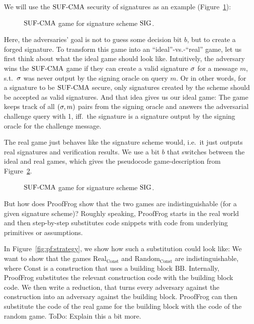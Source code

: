 We will use the ${\mathrm{SUF}\text{-}\mathrm{CMA}}$ security of signatures as an example (Figure~\ref{fig:pf:sufcma}):
\begin{figure}[ht]
    \centering
    \nicoresetlinenr%
    \fbox{%
        \scalebox{\codescalefactor}{%
            
        }%
    }
    \caption{${\mathrm{SUF}\text{-}\mathrm{CMA}}$ game for signature scheme $\mathrm{SIG}$.}
    \label{fig:pf:sufcma}
\end{figure}

Here, the adversaries' goal is not to guess some decision bit $b$, but to create a forged signature.
To transform this game into an ``ideal''-vs.-``real'' game, let us first think about what the ideal game should look like.
Intuitively, the adversary wins the ${\mathrm{SUF}\text{-}\mathrm{CMA}}$ game if they can create a valid signature $\sigma$ for a message $m$, s.t.\ 
$\sigma$ was never output by the signing oracle on query $m$.
Or in other words, for a signature to be ${\mathrm{SUF}\text{-}\mathrm{CMA}}$ secure, only signatures created by the scheme should be accepted as valid signatures.
And that idea gives us our ideal game:
The game keeps track of all $(\sigma, m)$ pairs from the signing oracle and answers the adversarial challenge query with 1, iff.\
the signature is a signature output by the signing oracle for the challenge message.

The real game just behaves like the signature scheme would, i.e.\ it just outputs real signatures and verification results.
We use a bit $b$ that switches between the ideal and real games, which gives the pseudocode game-description from Figure~\ref{fig:pf:sufcmaIR}.

\begin{figure}[ht]
    \centering
    \nicoresetlinenr%
    \fbox{%
        \scalebox{\codescalefactor}{%
            
        }%
    }
    \caption{${\mathrm{SUF}\text{-}\mathrm{CMA}}$ game for signature scheme $\mathrm{SIG}$.}
    \label{fig:pf:sufcmaIR}
\end{figure}

But how does ProofFrog show that the two games are indistinguishable (for a given signature scheme)?
Roughly speaking, ProofFrog starts in the real world and then step-by-step substitutes code snippets with code from underlying primitives or assumptions.

In Figure~\ref{fig:pf:strategy}, we show how such a substitution could look like:
We want to show that the games $\mathrm{Real}_\mathrm{Const}$ and $\mathrm{Random}_\mathrm{Const}$ are indistinguishable, 
where $\mathrm{Const}$ is a construction that uses a building block $\mathrm{BB}$.
Internally, ProofFrog substitutes the relevant construction code with the building block code.
We then write a reduction, that turns every adversary against the construction into an adversary against the building block.
ProofFrog can then substitute the code of the real game for the building block with the code of the random game.
\alert{ToDo: Explain this a bit more.}

